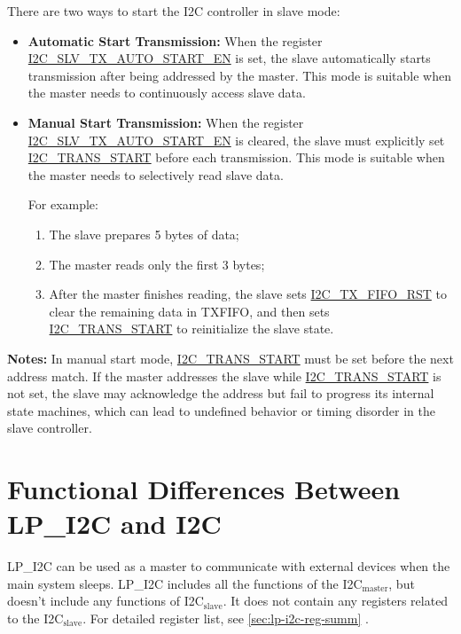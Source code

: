 \documentclass[main\_\_EN.tex]{subfiles}
\begin{document}
There are two ways to start the I2C controller in slave mode:

\begin{itemize}
  \item \textbf{Automatic Start Transmission:}
  When the register \hyperref[fielddesc:I2CSLVTXAUTOSTARTEN]{I2C\_SLV\_TX\_AUTO\_START\_EN} is set, the slave automatically starts transmission after being addressed by the master.
  This mode is suitable when the master needs to continuously access slave data.

  \item \textbf{Manual Start Transmission:}
  When the register \hyperref[fielddesc:I2CSLVTXAUTOSTARTEN]{I2C\_SLV\_TX\_AUTO\_START\_EN} is cleared, the slave must explicitly set \hyperref[fielddesc:I2CTRANSSTART]{I2C\_TRANS\_START} before each transmission.
  This mode is suitable when the master needs to selectively read slave data.

  For example:
  \begin{enumerate}
    \item The slave prepares 5 bytes of data;
    \item The master reads only the first 3 bytes;
    \item After the master finishes reading, the slave sets \hyperref[fielddesc:I2CTXFIFORST]{I2C\_TX\_FIFO\_RST} to clear the remaining data in TXFIFO, and then sets \hyperref[fielddesc:I2CTRANSSTART]{I2C\_TRANS\_START} to reinitialize the slave state.
  \end{enumerate}
\end{itemize}

{\bfseries Notes:}
In manual start mode, \hyperref[fielddesc:I2CTRANSSTART]{I2C\_TRANS\_START} must be set before the next address match. If the master addresses the slave while \hyperref[fielddesc:I2CTRANSSTART]{I2C\_TRANS\_START} is not set, the slave may acknowledge the address but fail to progress its internal state machines, which can lead to undefined behavior or timing disorder in the slave controller.

\section{Functional Differences Between LP\_I2C and I2C}

LP\_I2C can be used as a master to communicate with external devices when the main system sleeps. LP\_I2C includes all the functions of the \chipname{} I2C$_\text{master}$, but doesn't include any functions of \chipname{} I2C$_\text{slave}$. It does not contain any registers related to the I2C$_\text{slave}$. For detailed register list, see \ref{sec:lp-i2c-reg-summ} .
\end{document}
